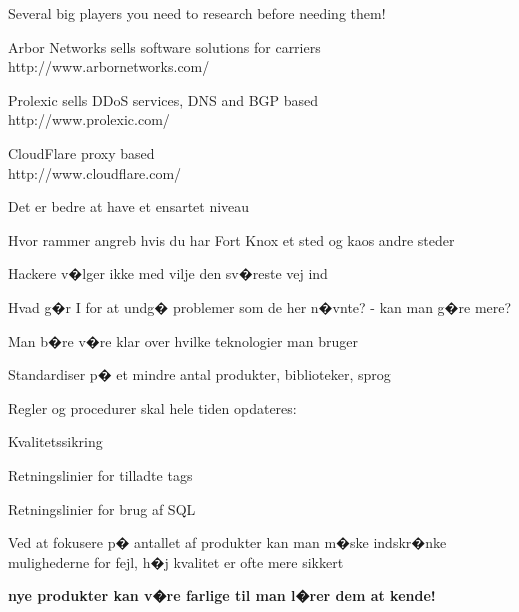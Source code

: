 \documentclass[20pt,landscape,a4paper,footrule]{foils}
\begin{document}


\begin{list2}
\item Several big players you need to research before needing them!
\item Arbor Networks sells software solutions for carriers\\
http://www.arbornetworks.com/

\item Prolexic sells DDoS services, DNS and BGP based\\
http://www.prolexic.com/

\item CloudFlare proxy based\\
http://www.cloudflare.com/
\end{list2}






\begin{list1}
\item Det er bedre at have et ensartet niveau
\item Hvor rammer angreb hvis du har Fort Knox et sted og kaos andre steder
\item Hackere v�lger ikke med vilje den sv�reste vej ind
\end{list1}





\begin{list1}
\item Hvad g�r I for at undg� problemer som de her n�vnte?
- kan man g�re mere?
\item Man b�re v�re klar over hvilke teknologier man bruger
\item Standardiser p� et mindre antal produkter, biblioteker, sprog
\item Regler og procedurer skal hele tiden opdateres:
\begin{list2}
\item Kvalitetssikring
\item Retningslinier for tilladte tags
\item Retningslinier for brug af SQL
\end{list2}

\item Ved at fokusere p� antallet af produkter kan man m�ske
  indskr�nke mulighederne for fejl, h�j kvalitet er ofte mere sikkert

\item {\bf nye produkter kan v�re farlige til man l�rer dem at kende!}
\end{list1}
\end{document}
